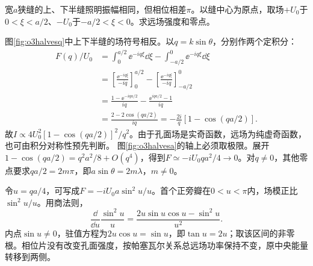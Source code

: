 \begin{exercise}\label{ex:o3phasehalves}
宽$a$狭缝的上、下半缝照明振幅相同，但相位相差$\pi$。以缝中心为原点，取场$+U_0$于$0<\xi<a/2$、$-U_0$于$-a/2<\xi<0$。求远场强度和零点。
\end{exercise}
\begin{solution}
图\ref{fig:o3halvesq}中上下半缝的场符号相反。以$q=k\sin\theta$，分别作两个定积分：
\begin{align*}
 F(q)/U_0&=\int_0^{a/2}\ee^{-iq\xi}\dd\xi
 -\int_{-a/2}^0\ee^{-iq\xi}\dd\xi\\
 &=\left[\frac{\ee^{-iq\xi}}{-iq}\right]_0^{a/2}
 -\left[\frac{\ee^{-iq\xi}}{-iq}\right]_{-a/2}^0\\
 &=\frac{1-\ee^{-iqa/2}}{iq}
 -\frac{\ee^{iqa/2}-1}{iq}\\
 &=\frac{2-2\cos(qa/2)}{iq}
 =-\frac{2i}{q}[1-\cos(qa/2)].
\end{align*}
故$I\propto4U_0^2[1-\cos(qa/2)]^2/q^2$。由于孔面场是实奇函数，远场为纯虚奇函数，也可由积分对称性预先判断。
图\ref{fig:o3halvesa}的轴上必须取极限。展开$1-\cos(qa/2)=q^2a^2/8+O(q^4)$，得到$F\simeq-iU_0qa^2/4\to0$。对$q\ne0$，其他零点要求$qa/2=2m\pi$，即$a\sin\theta=2m\lambda$，$m\ne0$。

令$u=qa/4$，可写成$F=-iU_0a\sin^2u/u$。首个正旁瓣在$0<u<\pi$内，场模正比$\sin^2u/u$。用商法则，
\[
 \frac{\dd}{\dd u}\frac{\sin^2u}{u}
 =\frac{2u\sin u\cos u-\sin^2u}{u^2}.
\]
内点$\sin u\ne0$，驻值方程为$2u\cos u=\sin u$，即$\tan u=2u$；取该区间的非零根。相位片没有改变孔面强度，按帕塞瓦尔关系总远场功率保持不变，原中央能量转移到两侧。
\end{solution}

